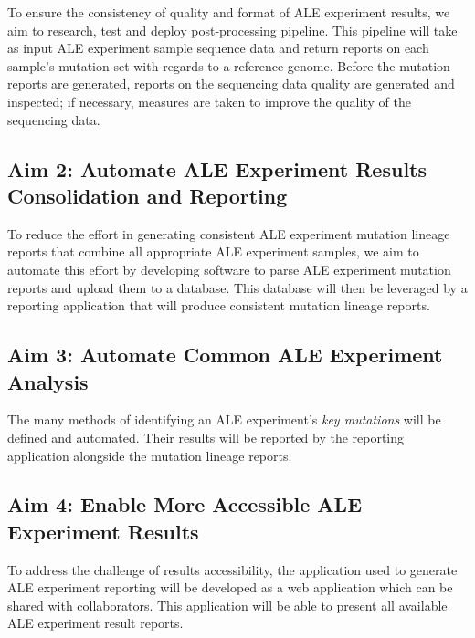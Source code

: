 \documentclass[12pt,final,masters,chapterheads]{ucsd}  %
\begin{document}
To ensure the consistency of quality and format of ALE experiment results, we aim to research, test and deploy post-processing pipeline. This pipeline will take as input ALE experiment sample sequence data and return reports on each sample's mutation set with regards to a reference genome. Before the mutation reports are generated, reports on the sequencing data quality are generated and inspected; if necessary, measures are taken to improve the quality of the sequencing data.


\subsection{Aim 2: Automate ALE Experiment Results Consolidation and Reporting}

To reduce the effort in generating consistent ALE experiment mutation lineage reports that combine all appropriate ALE experiment samples, we aim to automate this effort by developing software to parse ALE experiment mutation reports and upload them to a database. This database will then be leveraged by a reporting application that will produce consistent mutation lineage reports.

\subsection{Aim 3: Automate Common ALE Experiment Analysis}

The many methods of identifying an ALE experiment's \textit{key mutations} will be defined and automated. Their results will be reported by the reporting application alongside the mutation lineage reports.

\subsection{Aim 4: Enable More Accessible ALE Experiment Results}

To address the challenge of results accessibility, the application used to generate ALE experiment reporting will be developed as a web application which can be shared with collaborators. This application will be able to present all available ALE experiment result reports.

\end{document}
